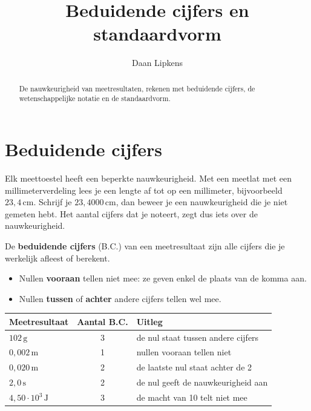 \documentclass{ximera}
\title{Beduidende cijfers en standaardvorm}
\author{Daan Lipkens}
\begin{document}
\begin{abstract}
    De nauwkeurigheid van meetresultaten, rekenen met beduidende cijfers, de wetenschappelijke notatie en de standaardvorm.
\end{abstract}
\maketitle

\section{Beduidende cijfers}\label{sec:beduidende_cijfers}
Elk meettoestel heeft een beperkte nauwkeurigheid. Met een meetlat met een millimeterverdeling lees je een lengte af tot op een millimeter, bijvoorbeeld $23{,}4 \, \mathrm{cm}$. Schrijf je $23{,}4000 \, \mathrm{cm}$, dan beweer je een nauwkeurigheid die je niet gemeten hebt. Het aantal cijfers dat je noteert, zegt dus iets over de nauwkeurigheid.

\begin{definition}[title={Beduidende cijfers}]\nl
    De \textbf{beduidende cijfers} (B.C.) van een meetresultaat zijn alle cijfers die je werkelijk afleest of berekent.
    \begin{itemize}
        \item Nullen \textbf{vooraan} tellen niet mee: ze geven enkel de plaats van de komma aan.
        \item Nullen \textbf{tussen} of \textbf{achter} andere cijfers tellen wel mee.
    \end{itemize}
\end{definition}

\begin{example}[title={Aantal beduidende cijfers}]\nl
    \begin{center}
        \begin{tabular}{|l|c|l|}
            \hline
            \textbf{Meetresultaat} & \textbf{Aantal B.C.} & \textbf{Uitleg} \\
            \hline
            $102 \, \mathrm{g}$ & 3 & de nul staat tussen andere cijfers \\
            $0{,}002 \, \mathrm{m}$ & 1 & nullen vooraan tellen niet \\
            $0{,}020 \, \mathrm{m}$ & 2 & de laatste nul staat achter de 2 \\
            $2{,}0 \, \mathrm{s}$ & 2 & de nul geeft de nauwkeurigheid aan \\
            $4{,}50 \cdot 10^{3} \, \mathrm{J}$ & 3 & de macht van 10 telt niet mee \\
            \hline
        \end{tabular}
    \end{center}
\end{example}
\end{document}
